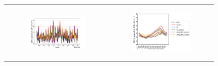 \begin{figure}[hbtp]
    \centering
    \begin{tabular}{cc}
        \begin{subfigure}[t]{0.5\textwidth}
            \caption{}
            \includegraphics[width=\textwidth]{images/chap5/SOP_TS_DC/time_series_cendrosa_wind_speed_10m.png}
        \end{subfigure} &
        \begin{subfigure}[t]{0.5\textwidth}
            \caption{}
            \includegraphics[width=\textwidth]{images/chap5/SOP_TS_DC/diurnal_cycle_cendrosa_wind_speed_10m.png}
        \end{subfigure} \\
        

\end{tabular}
\end{figure}
